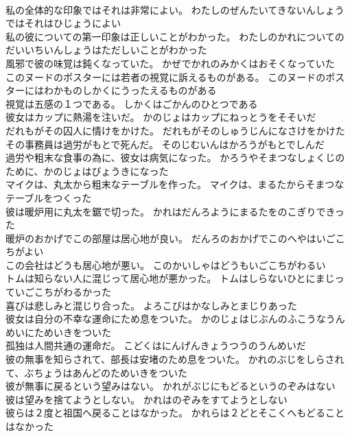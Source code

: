 \documentclass[8pt]{extreport}
\begin{document}
\begin{CJK}{UTF8}{min}
\\	私の全体的な印象ではそれは非常によい。	わたしのぜんたいてきないんしょうではそれはひじょうによい 
\\	私の彼についての第一印象は正しいことがわかった。	わたしのかれについてのだいいちいんしょうはただしいことがわかった 
\\	風邪で彼の味覚は鈍くなっていた。	かぜでかれのみかくはおそくなっていた 
\\	このヌードのポスターには若者の視覚に訴えるものがある。	このヌードのポスターにはわかものしかくにうったえるものがある 
\\	視覚は五感の１つである。	しかくはごかんのひとつである 
\\	彼女はカップに熱湯を注いだ。	かのじょはカップにねっとうをそそいだ 
\\	だれもがその囚人に情けをかけた。	だれもがそのしゅうじんになさけをかけた 
\\	その事務員は過労がもとで死んだ。	そのじむいんはかろうがもとでしんだ 
\\	過労や粗末な食事の為に、彼女は病気になった。	かろうやそまつなしょくじのために、かのじょはびょうきになった 
\\	マイクは、丸太から粗末なテーブルを作った。	マイクは、まるたからそまつなテーブルをつくった 
\\	彼は暖炉用に丸太を鋸で切った。	かれはだんろようにまるたをのこぎりできった 
\\	暖炉のおかげでこの部屋は居心地が良い。	だんろのおかげでこのへやはいごこちがよい 
\\	この会社はどうも居心地が悪い。	このかいしゃはどうもいごこちがわるい 
\\	トムは知らない人に混じって居心地が悪かった。	トムはしらないひとにまじっていごこちがわるかった 
\\	喜びは悲しみと混じり合った。	よろこびはかなしみとまじりあった 
\\	彼女は自分の不幸な運命にため息をついた。	かのじょはじぶんのふこうなうんめいにためいきをついた 
\\	孤独は人間共通の運命だ。	こどくはにんげんきょうつうのうんめいだ 
\\	彼の無事を知らされて、部長は安堵のため息をついた。	かれのぶじをしらされて、ぶちょうはあんどのためいきをついた 
\\	彼が無事に戻るという望みはない。	かれがぶじにもどるというのぞみはない 
\\	彼は望みを捨てようとしない。	かれはのぞみをすてようとしない 
\\	彼らは２度と祖国へ戻ることはなかった。	かれらは２どとそこくへもどることはなかった 

\end{CJK}
\end{document}
